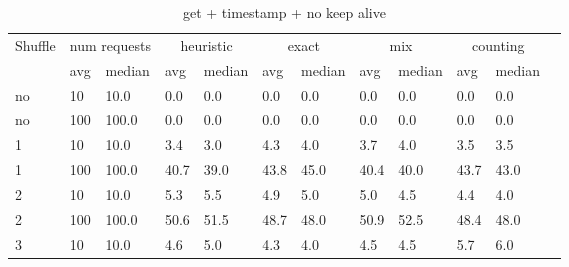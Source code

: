 \documentclass[12pt,a4paper]{report}
\begin{document}
\begin{table}[h]
	\centering
	\caption{get + timestamp + no keep alive}
	\label{tab:get_ts_nka}
	\begin{tabular}{|l|l|l|l|l|l|l|l|l|l|l|l|}
		\hline
		\multirow{2}{*}{Shuffle} & \multicolumn{2}{|c|}{num requests} & \multicolumn{2}{|c|}{heuristic} & \multicolumn{2}{|c|}{exact} & \multicolumn{2}{|c|}{mix} & \multicolumn{2}{|c|}{counting}                                          \\ \cline{2-11}
		                         & avg                                & median                          & avg                         & median                    & avg                            & median & avg  & median & avg  & median \\ \hline
		no                       & 10                                 & 10.0                            & 0.0                         & 0.0                       & 0.0                            & 0.0    & 0.0  & 0.0    & 0.0  & 0.0    \\ \hline
		no                       & 100                                & 100.0                           & 0.0                         & 0.0                       & 0.0                            & 0.0    & 0.0  & 0.0    & 0.0  & 0.0    \\ \hline
		1                        & 10                                 & 10.0                            & 3.4                         & 3.0                       & 4.3                            & 4.0    & 3.7  & 4.0    & 3.5  & 3.5    \\ \hline
		1                        & 100                                & 100.0                           & 40.7                        & 39.0                      & 43.8                           & 45.0   & 40.4 & 40.0   & 43.7 & 43.0   \\ \hline
		2                        & 10                                 & 10.0                            & 5.3                         & 5.5                       & 4.9                            & 5.0    & 5.0  & 4.5    & 4.4  & 4.0    \\ \hline
		2                        & 100                                & 100.0                           & 50.6                        & 51.5                      & 48.7                           & 48.0   & 50.9 & 52.5   & 48.4 & 48.0   \\ \hline
		3                        & 10                                 & 10.0                            & 4.6                         & 5.0                       & 4.3                            & 4.0    & 4.5  & 4.5    & 5.7  & 6.0    \\ \hline

\end{tabular}
\end{table}
\end{document}
